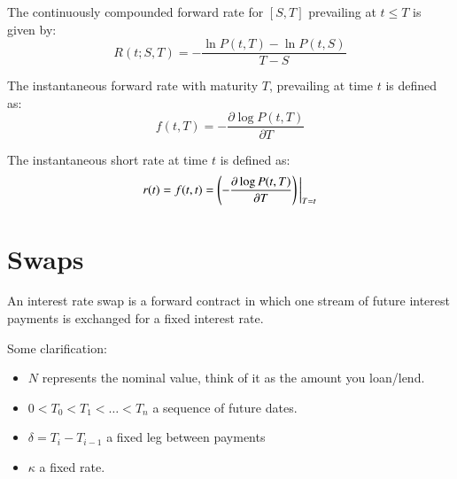 \begin{definition}
The continuously compounded forward rate for $[S,T]$ prevailing at $t\leq T$ is given by:
\begin{equation*}
    R(t;S,T) = -\frac{\ln{P(t,T)}-\ln{P(t,S)}}{T-S}
\end{equation*}    
\end{definition}

\begin{definition}
The instantaneous forward rate with maturity $T$, prevailing at time $t$ is defined as:
\begin{equation*}
    f(t,T) = -\frac{\partial \log P(t,T)}{\partial T}
\end{equation*}
\end{definition}

\begin{definition}
The instantaneous short rate at time $t$ is defined as:
\begin{align*}
r(t) = f(t,t) = \left(-\frac{\partial \log P(t,T)}{\partial T}\right)\bigg{|}_{T = t}
\end{align*}
\end{definition}

\section{Swaps}
\label{sec: ZCB_swap}

\begin{definition}
An interest rate swap is a forward contract in which one stream of future interest payments is exchanged for a fixed interest rate. 
\end{definition}

Some clarification: 
\begin{itemize}
    \item $N$ represents the nominal value, think of it as the amount you loan/lend. 
    \item $0< T_{0} < T_{1} < \dots < T_{n}$ a sequence of future dates. 
    \item $\delta = T_{i} - T_{i-1}$ a fixed leg between payments 
    \item $\kappa$ a fixed rate.
\end{itemize} 

